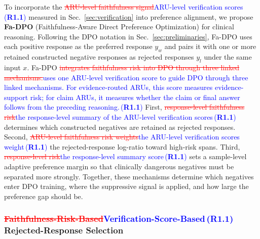\documentclass[a4paper,fleqn,doubleblind]{cas-sc}
\DeclareRobustCommand{\deleted}[1]{\textcolor{red}{\sout{#1}}}
\DeclareRobustCommand{\added}[1]{\textcolor{blue}{#1}}
\DeclareRobustCommand{\revtag}[1]{\textcolor{blue}{\scriptsize\,(\textbf{#1})}}
\begin{document}
\label{sec:dpo}
To incorporate the \deleted{ARU-level faithfulness signal}\added{ARU-level verification scores}\revtag{R1.1} measured in Sec.~\ref{sec:verification} into preference alignment, we propose \textbf{Fa-DPO} (Faithfulness-Aware Direct Preference Optimization) for clinical reasoning.
Following the DPO notation in Sec.~\ref{sec:preliminaries}, Fa-DPO uses each positive response as the preferred response $y_w$ and pairs it with one or more retained constructed negative responses as rejected responses $y_l$ under the same input $x$.
Fa-DPO \deleted{integrates faithfulness risk into DPO through three linked mechanisms.}\added{uses one ARU-level verification score to guide DPO through three linked mechanisms. For evidence-routed ARUs, this score measures evidence-support risk; for claim ARUs, it measures whether the claim or final answer follows from the preceding reasoning.}\revtag{R1.1} First, \deleted{response-level faithfulness risk}\added{the response-level summary of the ARU-level verification scores}\revtag{R1.1} determines which constructed negatives are retained as rejected responses. Second, \deleted{ARU-level faithfulness risk weights}\added{the ARU-level verification scores weight}\revtag{R1.1} the rejected-response log-ratio toward high-risk spans. Third, \deleted{response-level risk}\added{the response-level summary score}\revtag{R1.1} sets a sample-level adaptive preference margin so that clinically dangerous negatives must be separated more strongly. Together, these mechanisms determine which negatives enter DPO training, where the suppressive signal is applied, and how large the preference gap should be.

\subsubsection{\deleted{Faithfulness-Risk-Based}\added{Verification-Score-Based}\revtag{R1.1} Rejected-Response Selection}
\label{sec:retention}
\end{document}
